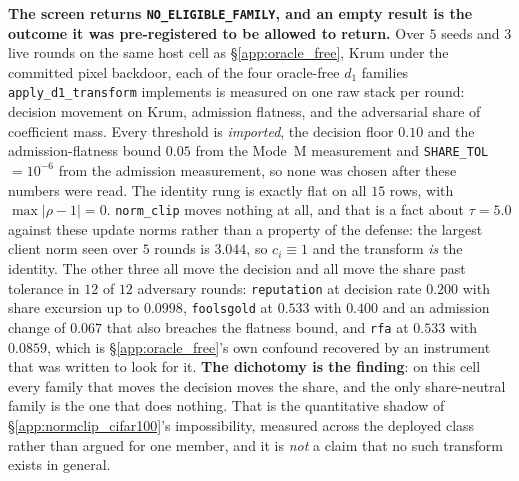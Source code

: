 \documentclass{article}
\begin{document}
\textbf{The screen returns \texttt{NO\_ELIGIBLE\_FAMILY}, and an empty result is the outcome it was pre-registered to be allowed to return.} Over $5$ seeds and $3$ live rounds on the same host cell as §\ref{app:oracle_free}, Krum under the committed pixel backdoor, each of the four oracle-free $d_1$ families \texttt{apply\_d1\_transform} implements is measured on one raw stack per round: decision movement on Krum, admission flatness, and the adversarial share of coefficient mass. Every threshold is \emph{imported}, the decision floor $0.10$ and the admission-flatness bound $0.05$ from the Mode~M measurement and \texttt{SHARE\_TOL} $=10^{-6}$ from the admission measurement, so none was chosen after these numbers were read. The identity rung is exactly flat on all $15$ rows, with $\max|\rho - 1| = 0$. \texttt{norm\_clip} moves nothing at all, and that is a fact about $\tau{=}5.0$ against these update norms rather than a property of the defense: the largest client norm seen over $5$ rounds is $3.044$, so $c_i \equiv 1$ and the transform \emph{is} the identity. The other three all move the decision and all move the share past tolerance in $12$ of $12$ adversary rounds: \texttt{reputation} at decision rate $0.200$ with share excursion up to $0.0998$, \texttt{foolsgold} at $0.533$ with $0.400$ and an admission change of $0.067$ that also breaches the flatness bound, and \texttt{rfa} at $0.533$ with $0.0859$, which is §\ref{app:oracle_free}'s own confound recovered by an instrument that was written to look for it. \textbf{The dichotomy is the finding}: on this cell every family that moves the decision moves the share, and the only share-neutral family is the one that does nothing. That is the quantitative shadow of §\ref{app:normclip_cifar100}'s impossibility, measured across the deployed class rather than argued for one member, and it is \emph{not} a claim that no such transform exists in general.
\end{document}
